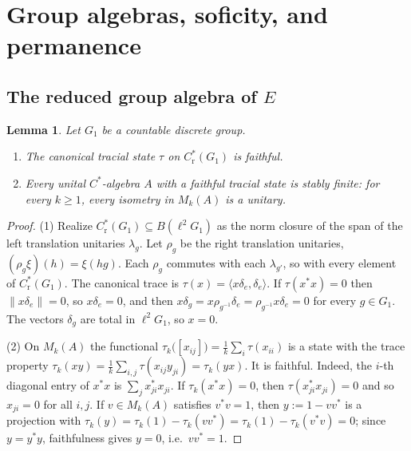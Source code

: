 \documentclass[11pt]{amsart}
\newcommand{\leanverified}[2]{\ignorespaces}
\newtheorem{lemma}[theorem]{Lemma}
\theoremstyle{definition}
\theoremstyle{remark}
\theoremstyle{plain}
\newcommand{\Cred}{C^*_{\mathrm r}}
\begin{document}
\section{Group algebras, soficity, and permanence}
\label{sec:algebras-sofic}

\subsection{The reduced group algebra of \texorpdfstring{$E$}{E}}

\begin{lemma}\label{lem:faithfultrace}
Let $G_1$ be a countable discrete group.
\begin{enumerate}
\item The canonical tracial state $\tau$ on $\Cred(G_1)$ is
faithful.
\item Every unital $C^*$-algebra $A$ with a faithful tracial state
is stably finite: for every $k\ge1$, every isometry in $M_k(A)$ is a
unitary.
\leanverified{Sofic/ManuscriptExactWrappers}{GroupApproximation.ManuscriptExactWrappers.manuscriptFaithfulTraceAndStableFiniteness}
\end{enumerate}
\end{lemma}

\begin{proof}
(1) Realize $\Cred(G_1)\subseteq B(\ell^2G_1)$ as the norm closure
of the span of the left translation unitaries $\lambda_g$.  Let
$\rho_g$ be the right translation unitaries,
$(\rho_g\xi)(h)=\xi(hg)$.  Each $\rho_g$ commutes with each
$\lambda_{g'}$, so with every element of $\Cred(G_1)$.  The
canonical trace is $\tau(x)=\langle x\delta_e,\delta_e\rangle$.  If
$\tau(x^*x)=0$ then $\lVert x\delta_e\rVert=0$, so $x\delta_e=0$,
and then
$x\delta_g=x\rho_{g^{-1}}\delta_e=\rho_{g^{-1}}x\delta_e=0$ for
every $g\in G_1$.  The vectors $\delta_g$ are total in
$\ell^2G_1$, so $x=0$.

(2) On $M_k(A)$ the functional
$\tau_k\bigl([x_{ij}]\bigr)=\tfrac1k\sum_i\tau(x_{ii})$ is a state
with the trace property
$\tau_k(xy)=\tfrac1k\sum_{i,j}\tau(x_{ij}y_{ji})=\tau_k(yx)$.
It is faithful.  Indeed, the $i$-th diagonal entry of $x^*x$ is
$\sum_jx_{ji}^*x_{ji}$.  If $\tau_k(x^*x)=0$, then
$\tau(x_{ji}^*x_{ji})=0$ and so $x_{ji}=0$ for all $i,j$.  If
$v\in M_k(A)$ satisfies $v^*v=1$, then $y:=1-vv^*$ is a projection
with
$\tau_k(y)=\tau_k(1)-\tau_k(vv^*)=\tau_k(1)-\tau_k(v^*v)=0$; since
$y=y^*y$, faithfulness gives $y=0$, i.e.\ $vv^*=1$.
\end{proof}
\end{document}
